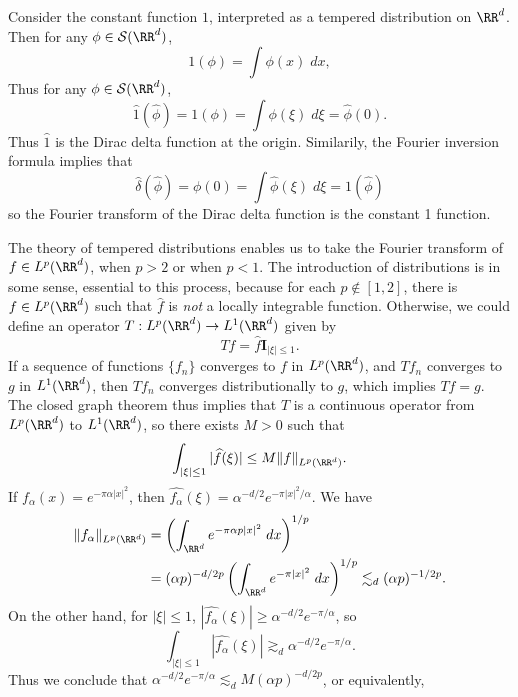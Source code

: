 \begin{example}
    Consider the constant function $1$, interpreted as a tempered distribution on $\RR^d$. Then for any $\phi \in \mathcal{S}(\RR^d)$,
    \[ 1(\phi) = \int \phi(x)\; dx, \]
    Thus for any $\phi \in \mathcal{S}(\RR^d)$,
    \[ \widehat{1} \left( \widehat{\phi} \right) = 1(\phi) = \int \phi(\xi)\; d\xi = \widehat{\phi}(0). \]
    Thus $\widehat{1}$ is the Dirac delta function at the origin. Similarily, the Fourier inversion formula implies that
    \[ \widehat{\delta} \left( \widehat{\phi} \right) = \phi(0) = \int \widehat{\phi}(\xi)\; d\xi = 1 \left( \widehat{\phi} \right) \]
    so the Fourier transform of the Dirac delta function is the constant 1 function.
\end{example}

\begin{example}
  The theory of tempered distributions enables us to take the Fourier transform of $f \in L^p(\RR^d)$, when $p > 2$ or when $p < 1$. The introduction of distributions is in some sense, essential to this process, because for each $p \not \in [1,2]$, there is $f \in L^p(\RR^d)$ such that $\widehat{f}$ is \emph{not} a locally integrable function. Otherwise, we could define an operator $T: L^p(\RR^d) \to L^1(\RR^d)$ given by
  \[ Tf = \widehat{f} \mathbf{I}_{|\xi| \leq 1}. \]
  If a sequence of functions $\{ f_n \}$ converges to $f$ in $L^p(\RR^d)$, and $Tf_n$ converges to $g$ in $L^1(\RR^d)$, then $Tf_n$ converges distributionally to $g$, which implies $Tf = g$. The closed graph theorem thus implies that $T$ is a continuous operator from $L^p(\RR^d)$ to $L^1(\RR^d)$, so there exists $M > 0$ such that
  \[ \int_{|\xi| \leq 1} |\widehat{f}(\xi)| \leq M \| f \|_{L^p(\RR^d)}. \]
  If $f_\alpha(x) = e^{-\pi \alpha |x|^2}$, then $\widehat{f_\alpha}(\xi) = \alpha^{-d/2} e^{-\pi |x|^2 / \alpha}$. We have
  \begin{align*}
    \| f_\alpha \|_{L^p(\RR^d)} &= \left( \int_{\RR^d} e^{- \pi \alpha p |x|^2}\; dx \right)^{1/p}\\
    &= (\alpha p)^{-d/2p} \left( \int_{\RR^d} e^{- \pi |x|^2}\; dx \right)^{1/p} \lesssim_d (\alpha p)^{-1/2p}.
  \end{align*}
  On the other hand, for $|\xi| \leq 1$, $|\widehat{f_\alpha}(\xi)| \geq \alpha^{-d/2} e^{-\pi/\alpha}$, so
  \[ \int_{|\xi| \leq 1} |\widehat{f_\alpha}(\xi)| \gtrsim_d \alpha^{-d/2} e^{-\pi/\alpha}. \]
  Thus we conclude that $\alpha^{-d/2} e^{-\pi/\alpha} \lesssim_d M (\alpha p)^{-d/2p}$, or equivalently,

\end{example}
